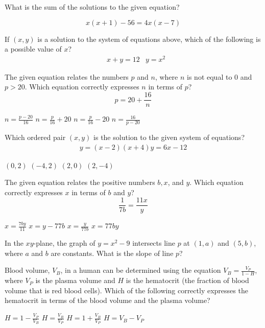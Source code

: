\question[1]
What is the sum of the solutions to the given equation?

\[
x(x+1)-56=4 x(x-7)
\]

\begin{solutionorbox}[1in]
\end{solutionorbox}

\question[1]
If $(x, y)$ is a solution to the system of equations above, which of the following is a possible value of $x$?
\[
\begin{aligned}
& x+y=12 
& y=x^{2}
\end{aligned}
\]
\begin{choices}
\end{choices}

\question[1]
The given equation relates the numbers $p$ and $n$, where $n$ is not equal to 0 and $p>20$. Which equation correctly expresses $n$ in terms of $p$?
\[
p=20+\frac{16}{n}
\]
\begin{choices}
  \choice $n=\frac{p-20}{16}$
  \choice $n=\frac{p}{16}+20$
  \choice $n=\frac{p}{16}-20$
  \CorrectChoice $n=\frac{16}{p-20}$
\end{choices}

\question[1]
Which ordered pair $(x, y)$ is the solution to the given system of equations?
\[
\begin{gathered}
y=(x-2)(x+4) 
y=6 x-12
\end{gathered}
\]
\begin{choices}
  \choice $(0,2)$
  \choice $(-4,2)$
  \CorrectChoice $(2,0)$
  \choice $(2,-4)$
\end{choices}

\question[1]
The given equation relates the positive numbers $b, x$, and $y$. Which equation correctly expresses $x$ in terms of $b$ and $y$?
\[
\frac{1}{7 b}=\frac{11 x}{y}
\]
\begin{choices}
  \choice $x=\frac{7 b y}{11}$
  \choice $x=y-77 b$
  \CorrectChoice $x=\frac{y}{77 b}$
  \choice $x=77 b y$
\end{choices}

\question[1]
In the $x y$-plane, the graph of $y=x^{2}-9$ intersects line $p$ at $(1, a)$ and $(5, b)$, where $a$ and $b$ are constants. What is the slope of line $p$?
\begin{choices}
\end{choices}

\question[1]
Blood volume, $V_B$, in a human can be determined using the equation $V_{B}=\frac{V_{P}}{1-H}$, where $V_{P}$ is the plasma volume and $H$ is the hematocrit (the fraction of blood volume that is red blood cells). Which of the following correctly expresses the hematocrit in terms of the blood volume and the plasma volume?
\begin{choices}
  \CorrectChoice $H=1-\frac{V_{P}}{V_{B}}$
  \choice $H=\frac{V_{B}}{V_{P}}$
  \choice $H=1+\frac{V_{B}}{V_{P}}$
  \choice $H=V_{B}-V_{P}$
\end{choices}


